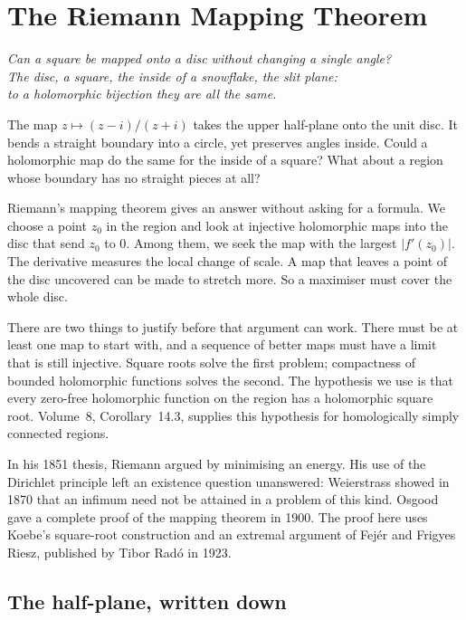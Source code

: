 \chapter{The Riemann Mapping Theorem}\label{ch:riemannmap}

\begin{center}\itshape
Can a square be mapped onto a disc without changing a single angle?\\
The disc, a square, the inside of a snowflake, the slit plane:\\
to a holomorphic bijection they are all the same.
\end{center}

The map $z\mapsto(z-i)/(z+i)$ takes the upper half-plane onto the unit disc.
It bends a straight boundary into a circle, yet preserves angles inside.
Could a holomorphic map do the same for the inside of a square? What about a
region whose boundary has no straight pieces at all?

Riemann's mapping theorem gives an answer without asking for a formula.
We choose a point $z_0$ in the region and look at injective holomorphic maps
into the disc that send $z_0$ to $0$. Among them, we seek the map with the
largest $|f'(z_0)|$. The derivative measures the local change of scale.
A map that leaves a point of the disc uncovered can be made to stretch more.
So a maximiser must cover the whole disc.

There are two things to justify before that argument can work. There must be
at least one map to start with, and a sequence of better maps must have a
limit that is still injective. Square roots solve the first problem;
compactness of bounded holomorphic functions solves the second.
The hypothesis we use is that every zero-free holomorphic function on the
region has a holomorphic square root. Volume~8, Corollary~14.3, supplies this
hypothesis for homologically simply connected regions.

In his 1851 thesis, Riemann argued by minimising an energy. His use of the
Dirichlet principle left an existence question unanswered: Weierstrass showed
in 1870 that an infimum need not be attained in a problem of this kind.
Osgood gave a complete proof of the mapping theorem in 1900. The proof here
uses Koebe's square-root construction and an extremal argument of Fej\'er
and Frigyes Riesz, published by Tibor Rad\'o in 1923.

\section{The half-plane, written down}

